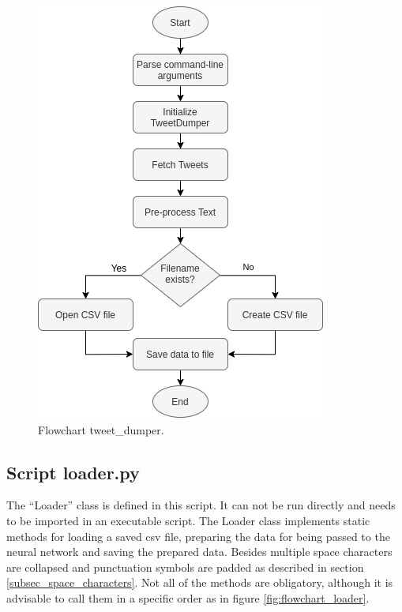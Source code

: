 \documentclass[conference]{IEEEtran}
\begin{document}
\begin{figure}[htbp]
\centerline{\includegraphics[scale=0.61]{pictures/flowchart_tweet_dumper.png}}
\caption{Flowchart tweet\_dumper.}
\label{fig:flowchart_tweet_dumper}
\end{figure}

\subsection{Script loader.py}\label{subsec_loader}

The ``Loader'' class is defined in this script. It can not be run directly and needs to be imported in an executable script. The Loader class implements static methods for loading a saved csv file, preparing the data for being passed to the neural network and saving the prepared data. Besides multiple space characters are collapsed and punctuation symbols are padded as described in section \ref{subsec_space_characters}. Not all of the methods are obligatory, although it is advisable to call them in a specific order as in figure \ref{fig:flowchart_loader}. 
\end{document}
